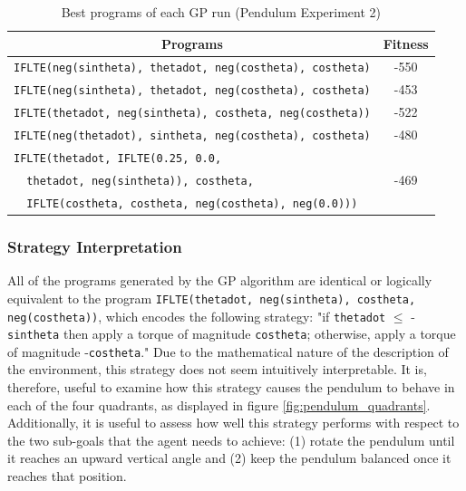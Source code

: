 \begin{table}[ht]
    \centering
    \begin{tabular}{|l|c|}
        \hline
        \multicolumn{1}{|c|}{\textbf{Programs}} & \textbf{Fitness} \\
        \hline
        
        \verb+IFLTE(neg(sintheta), thetadot, neg(costheta), costheta)+ & -550  \\ \hline
        \verb+IFLTE(neg(sintheta), thetadot, neg(costheta), costheta)+ & -453  \\ \hline
        \verb+IFLTE(thetadot, neg(sintheta), costheta, neg(costheta))+ & -522  \\ \hline
        \verb+IFLTE(neg(thetadot), sintheta, neg(costheta), costheta)+ & -480  \\ \hline
        
        \verb+IFLTE(thetadot, IFLTE(0.25, 0.0,+ & \\
        \verb+  thetadot, neg(sintheta)), costheta,+ & -469 \\
        \verb+  IFLTE(costheta, costheta, neg(costheta), neg(0.0)))+ & \\
        \hline
    \end{tabular}
    \caption{Best programs of each GP run (Pendulum Experiment 2)}
    \label{tab:pendulum_exp2_best_programs}
\end{table}

\subsubsection{Strategy Interpretation}
All of the programs generated by the GP algorithm are identical or logically equivalent to the program \verb+IFLTE(thetadot, neg(sintheta), costheta, neg(costheta))+, which encodes the following strategy: "if \verb+thetadot+ $\leq$ -\verb+sintheta+ then apply a torque of magnitude \verb+costheta+; otherwise, apply a torque of magnitude -\verb+costheta+." Due to the mathematical nature of the description of the environment, this strategy does not seem intuitively interpretable. It is, therefore, useful to examine how this strategy causes the pendulum to behave in each of the four quadrants, as displayed in figure \ref{fig:pendulum_quadrants}. Additionally, it is useful to assess how well this strategy performs with respect to the two sub-goals that the agent needs to achieve: (1) rotate the pendulum until it reaches an upward vertical angle and (2) keep the pendulum balanced once it reaches that position.


